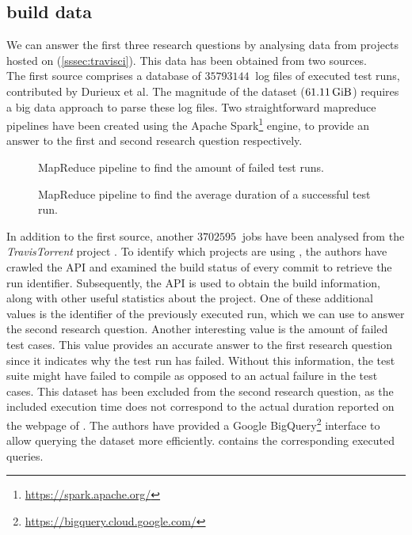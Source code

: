 
\subsection{\travisci{} build data}
We can answer the first three research questions by analysing data from projects hosted on \travisci{} (\cref{sssec:travisci}). This data has been obtained from two sources.\\

\noindent The first source comprises a database \cite{travisanalysis} of $\SI{35793144}{}$ log files of executed test runs, contributed by Durieux et al. The magnitude of the dataset ($\SI{61.11}{\gibi\byte}$) requires a big data approach to parse these log files. Two straightforward \Gls{mapreduce} pipelines have been created using the Apache Spark\footnote{\url{https://spark.apache.org/}} engine, to provide an answer to the first and second research question respectively.\\

\begin{figure}[htbp!]
	\centering
	
	\caption{MapReduce pipeline to find the amount of failed test runs.}
	\label{fig:eval-mapreduce-1}
\end{figure}

\begin{figure}[htbp!]
	\centering
	
	\caption{MapReduce pipeline to find the average duration of a successful test run.}
	\label{fig:eval-mapreduce-2}
\end{figure}

\noindent In addition to the first source, another $\SI{3702595}{}$ jobs have been analysed from the \mbox{\emph{TravisTorrent}} project \cite{msr17challenge}. To identify which projects are using \travisci{}, the authors have crawled the \github{} API and examined the build status of every commit to retrieve the run identifier. Subsequently, the \travisci{} API is used to obtain the build information, along with other useful statistics about the project. One of these additional values is the identifier of the previously executed run, which we can use to answer the second research question. Another interesting value is the amount of failed test cases. This value provides an accurate answer to the first research question since it indicates why the test run has failed. Without this information, the test suite might have failed to compile as opposed to an actual failure in the test cases. This dataset has been excluded from the second research question, as the included execution time does not correspond to the actual duration reported on the webpage of \travisci{}. The authors have provided a Google BigQuery\footnote{\url{https://bigquery.cloud.google.com/}} interface to allow querying the dataset more efficiently.  contains the corresponding executed queries.